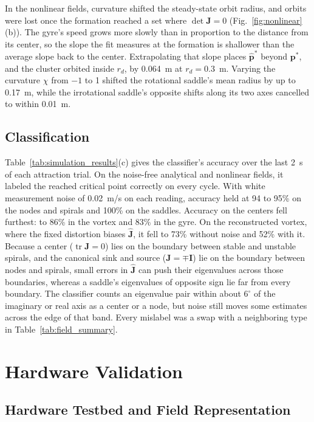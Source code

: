 \documentclass[lettersize,journal]{IEEEtran}
\newcommand{\rev}[1]{#1}
\begin{document}
In the nonlinear fields, curvature shifted the steady-state orbit radius, and orbits were lost once the formation reached a set where $\det\mathbf{J} = 0$ (Fig.~\ref{fig:nonlinear}(b)). The gyre's speed grows more slowly than in proportion to the distance from its center, so the slope the fit measures at the formation is shallower than the average slope back to the center. Extrapolating that slope places $\hat{\mathbf{p}}^*$ beyond $\mathbf{p}^*$, and the cluster orbited inside $r_d$, by \rev{0.064}~m at $r_d = 0.3$~m. Varying the curvature $\chi$ from $-1$ to 1 shifted the rotational saddle's mean radius by up to \rev{0.17}~m, while the irrotational saddle's opposite shifts along its two axes cancelled to within \rev{0.01}~m.

\subsection{Classification}
\label{sec:sim_class}

Table~\ref{tab:simulation_results}(c) gives the classifier's accuracy over the last 2~s of each attraction trial. On the noise-free analytical and nonlinear fields, it labeled the reached critical point correctly on every cycle. With white measurement noise of 0.02~m/s on each reading, accuracy held at \rev{94} to \rev{95}\% on the nodes and spirals and \rev{100}\% on the saddles. Accuracy on the centers fell furthest: to \rev{86}\% in the vortex and \rev{83}\% in the gyre. On the reconstructed vortex, where the fixed distortion biases $\hat{\mathbf{J}}$, it fell to \rev{73}\% without noise and \rev{52}\% with it. Because a center ($\operatorname{tr}\mathbf{J} = 0$) lies on the boundary between stable and unstable spirals, and the canonical sink and source ($\mathbf{J} = \mp\mathbf{I}$) lie on the boundary between nodes and spirals, small errors in $\hat{\mathbf{J}}$ can push their eigenvalues across those boundaries, whereas a saddle's eigenvalues of opposite sign lie far from every boundary. The classifier counts an eigenvalue pair within about $6^\circ$ of the imaginary or real axis as a center or a node, but noise still moves some estimates across the edge of that band. Every mislabel was a swap with a neighboring type in Table~\ref{tab:field_summary}.

\section{Hardware Validation}


\subsection{Hardware Testbed and Field Representation}
\label{sec:hw_testbed}
\end{document}

